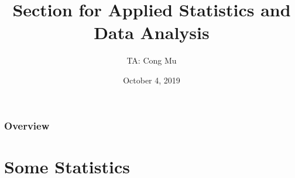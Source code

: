 \documentclass[serif,mathserif,professionalfont]{beamer}
\title[Section for EN.553.413/613]{Section for Applied Statistics and Data Analysis} %
\author{TA: Cong Mu} %
\institute[cmu2@jhu.edu] %
{
Office Hour: Wednesday 10:00AM - 12:00PM
\medskip
\textit{} %
}
\date{October 4, 2019} %
\begin{document}
\begin{frame}
\titlepage %
\end{frame}

\begin{frame}
\frametitle{Overview} %
\tableofcontents %
\end{frame}




\section{Some Statistics}


%	
%    	
	
	
\end{document}
